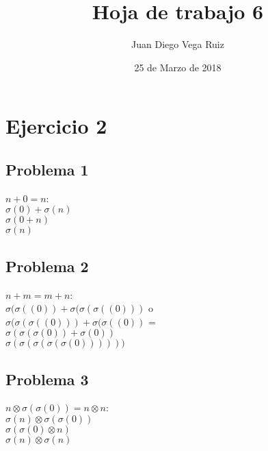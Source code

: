 \documentclass[8pt, a4paper]{article} %
\author{Juan Diego Vega Ruiz} %
\date{25 de Marzo de 2018} %
\begin{document}
  \title{Hoja de trabajo 6} %
   \maketitle %
    
    \section{Ejercicio 2} %
    \subsection{Problema 1} %
      $n+0=n$:\\
            $\sigma(0) + \sigma(n)$\\
            $\sigma (0 + n)$\\
            $\sigma(n)$
    \subsection{Problema 2}
      $n+m = m+n$:\\
            $\sigma(\sigma((0)) + \sigma(\sigma(\sigma((0)))$ o \\
            $\sigma(\sigma(\sigma((0))) + \sigma(\sigma((0))$ =\\
            $\sigma (\sigma(\sigma(0)) + \sigma(0))$\\
            $\sigma(\sigma(\sigma(\sigma(\sigma(0))))))$
    \subsection{Problema 3}
       $n \otimes \sigma(\sigma(0)) = n \otimes n$:\\
            $\sigma(n) \otimes \sigma(\sigma(0))$\\
            $\sigma (\sigma(0) \otimes n)$\\
            $\sigma(n) \otimes \sigma(n)$
    
\end{document}
